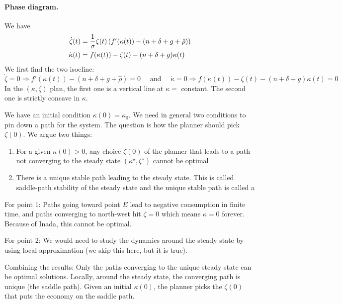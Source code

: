 \documentclass[10pt]{article}
\begin{document}
\paragraph{Phase diagram.} We have
\begin{align*}
	\dot{\zeta}(t) &= \frac{1}{\sigma} \zeta(t) \left( f'(\kappa(t)) - (n + \delta + g + \hat{\rho})\right) \\
	\dot{\kappa}(t) &= f(\kappa(t)) - \zeta(t) - (n + \delta + g)\kappa(t)
\end{align*}
We first find the two isocline:
\[
\dot{\zeta} = 0 \Rightarrow f'(\kappa(t)) - (n + \delta + g + \hat{\rho}) = 0 \quad \text{ and } \quad \dot{\kappa} = 0 \Rightarrow f(\kappa(t)) - \zeta(t) - (n + \delta + g)\kappa(t) = 0
\]
In the $(\kappa,\zeta)$ plan, the first one is a vertical line at $\kappa = $ constant. The second one is strictly concave in $\kappa$.

We have an initial condition $\kappa(0) = \kappa_0$. We need in general two conditions to pin down a path for the system. The question is how the planner should pick $\zeta(0)$. We argue two things:
\begin{enumerate}
	\item For a given $\kappa(0) > 0$, any choice $\zeta(0)$ of the planner that leads to a path not converging to the steady state $(\kappa^\star,\zeta^\star)$ cannot be optimal
	\item There is a unique stable path leading to the steady state. This is called saddle-path stability of the steady state and the unique stable path is called a 
\end{enumerate}

For point 1: Paths going toward point $E$ lead to negative consumption in finite time, and paths converging to north-west hit $\zeta = 0$ which means $\kappa = 0$ forever. Because of Inada, this cannot be optimal.

For point 2: We would need to study the dynamics around the steady state by using local approximation (we skip this here, but it is true).

Combining the results: Only the paths converging to the unique steady state can be optimal solutions. Locally, around the steady state, the converging path is unique (the saddle path). Given an initial $\kappa(0)$, the planner picks the $\zeta(0)$ that puts the economy on the saddle path.
\end{document}
